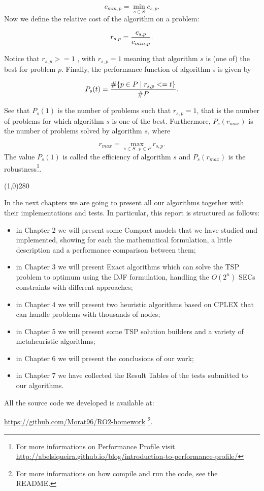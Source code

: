 \begin{equation}
	c_{min,p} = \min_{s \in S} c_{s,p}.
\end{equation}
\noindent 
Now we define the relative cost of the algorithm on a problem:

\begin{equation}
	r_{s,p} = {c_{s,p} \over c_{min,p}}.
\end{equation}

\noindent 
Notice that $r_{s,p} >= 1$ , with $r_{s,p}=1$ meaning that algorithm $s$ is (one of) the best for problem $p$. Finally, the performance function of algorithm s is given by

\begin{equation}
	P_s(t) = {\#\{p \in P \;|\; r_{s,p} <= t \} \over \#P}.
\end{equation}

\noindent 
See that $P_s(1)$ is the number of problems such that $r_{s,p} = 1$, that is the number of problems for which algorithm $s$ is one of the best. Furthermore, $P_s(r_{max})$ is the number of problems solved by algorithm $s$, where

\begin{equation}
	r_{max} = \max_{s \in S,\; p \in P} r_{s,p}.
\end{equation}
\noindent
The value $P_s(1)$ is called the efficiency of algorithm $s$ and $P_s(r_{max})$ is the robustness\footnote{For more informations on Performance Profile visit \url{http://abelsiqueira.github.io/blog/introduction-to-performance-profile/}}.

\begin{center}
\line(1,0){280}
\end{center}

\noindent 
In the next chapters we are going to present all our algorithms together with their implementations and tests. In particular, this report is structured as follows:

\begin{itemize}
  \item in Chapter 2 we will present some Compact models that we have studied and implemented, showing for each the mathematical formulation, a little description and a performance comparison between them;
  \item in Chapter 3 we will present Exact algorithms which can solve the TSP problem to optimum using the DJF formulation, handling the $O(2^n)$ SECs constraints with different approaches;
    \item in Chapter 4 we will present two heuristic algorithms based on CPLEX that can handle problems with thousands of nodes;
    \item in Chapter 5 we will present some TSP solution builders and a variety of metaheuristic algorithms;
     \item in Chapter 6 we will present the conclusions of our work;
     \item in Chapter 7 we have collected the Result Tables of the tests submitted to our algorithms.
\end{itemize}

All the source code we developed is available at:
\begin{center}
\url{https://github.com/Morat96/RO2-homework} \footnote{For more informations on how compile and run the code, see the README.}. 

\end{center}

